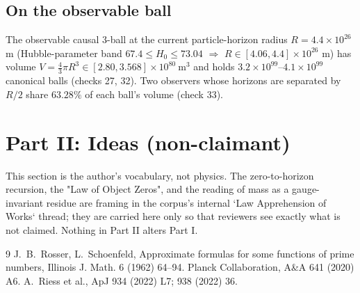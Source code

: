 \documentclass[11pt]{article}
\begin{document}
\subsection{On the observable ball}
The observable causal 3-ball at the current particle-horizon radius
\(R=4.4\times10^{26}\) m (Hubble-parameter band
\({67.4\le H_0\le 73.04}\) \(\Rightarrow\) \(R\in[4.06,4.4]\times10^{26}\) m)
has volume \(V=\tfrac43\pi R^3\in[2.80,3.568]\times10^{80}\ \text{m}^3\) and
holds \(3.2\times10^{99}\)--\(4.1\times10^{99}\) canonical balls (checks 27, 32).
Two observers whose horizons are separated by \(R/2\) share \(63.28\%\) of
each ball's volume (check 33).

\section{Part II: Ideas (non-claimant)}%
\label{ideas}
This section is the author's vocabulary, not physics. The zero-to-horizon
recursion, the "Law of Object Zeros", and the reading of mass as a
gauge-invariant residue are framing in the corpus's internal `Law Apprehension
of Works` thread; they are carried here only so that reviewers see exactly
what is not claimed. Nothing in Part II alters Part I.

\begin{thebibliography}{9}
 J.~B.~Rosser, L.~Schoenfeld, {Approximate formulas for some
functions of prime numbers}, Illinois J. Math. 6 (1962) 64--94.
 Planck Collaboration, A&A 641 (2020) A6.
 A.~Riess et al., ApJ 934 (2022) L7; 938 (2022) 36.
\end{thebibliography}
\end{document}
